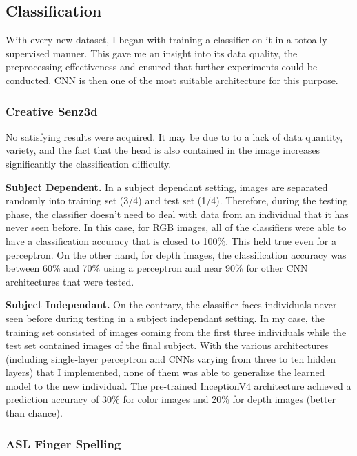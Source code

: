 \subsection{Classification} \label{subsection:classif}

With every new dataset, I began with training a classifier on it in a
totoally supervised manner.
This gave me an insight into its data quality, the preprocessing
effectiveness and ensured that further experiments could be conducted.
CNN is then one of the most suitable architecture for this purpose.

\subsubsection{Creative Senz3d}

No satisfying results were acquired. It may be due to to a lack of data
quantity, variety, and the fact that the head is also contained in the
image increases significantly the classification difficulty.

\textbf{Subject Dependent.}
In a subject dependant setting, images are separated randomly into
training set (3/4) and test set (1/4). Therefore, during the
testing phase, the classifier doesn't need to deal with data from an
individual that it has never seen before.
In this case, for RGB images, all of the classifiers were able to
have a classification accuracy that is closed to 100\%. This held true
even for a perceptron.
On the other hand, for depth images, the classification accuracy was
between 60\% and 70\% using a perceptron and near 90\% for other CNN
architectures that were tested.

\textbf{Subject Independant.}
On the contrary, the classifier faces individuals never seen before
during testing in a subject independant setting. 
In my case, the training set consisted of images coming from the
first three individuals while the test set contained images of
the final subject.
With the various architectures (including single-layer perceptron
and CNNs varying from three to ten hidden layers)
that I implemented, none of them was able to generalize the learned model
to the new individual.
The pre-trained InceptionV4 architecture \cite{C. Szegedy 2017}
achieved a prediction accuracy
of 30\% for color images and 20\% for depth images (better than chance).

\subsubsection{ASL Finger Spelling} \label{subsubsection:ASL_CNN}

